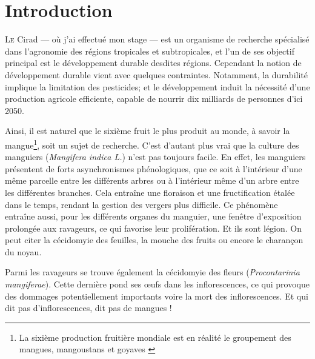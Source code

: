 \chapter{Introduction}

\lettrine{L}{e} Cirad --- où j'ai effectué mon stage --- est un organisme de recherche spécialisé dans l'agronomie des régions tropicales et subtropicales, et l'un de ses objectif principal est le développement durable desdites régions.
Cependant la notion de développement durable vient avec quelques contraintes.
Notamment, la durabilité implique la limitation des pesticides; et le développement induit la nécessité d'une production agricole efficiente, capable de nourrir dix milliards de personnes d'ici 2050.

Ainsi, il est naturel que le sixième fruit le plus produit au monde, à savoir la mangue\footnote{La sixième production fruitière mondiale est en réalité le groupement des mangues, mangoustans et goyaves \citep{fao}}, soit un sujet de recherche.
C'est d'autant plus vrai que la culture des manguiers (\emph{Mangifera indica L.}) n'est pas toujours facile.
En effet, les manguiers présentent de forts asynchronismes phénologiques, que ce soit à l'intérieur d'une même parcelle entre les différents arbres ou à l'intérieur même d'un arbre entre les différentes branches.
Cela entraîne une floraison et une fructification étalée dans le temps, rendant la gestion des vergers plus difficile.
Ce phénomène entraîne aussi, pour les différents organes du manguier, une fenêtre d'exposition prolongée aux ravageurs, ce qui favorise leur prolifération.
Et ils sont légion.
On peut citer la cécidomyie des feuilles, la mouche des fruits ou encore le charançon du noyau.

Parmi les ravageurs se trouve également la cécidomyie des fleurs (\emph{Procontarinia mangiferae}). Cette dernière pond ses œufs dans les inflorescences, ce qui provoque des dommages potentiellement importants voire la mort des inflorescences. Et qui dit pas d'inflorescences, dit pas de mangues !


